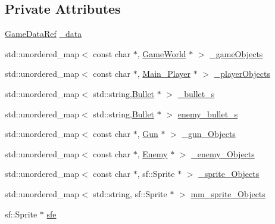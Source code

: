 \subsection*{Private Attributes}
\begin{DoxyCompactItemize}
\item 
\hyperlink{namespaceSekander_a1d69b002ba2d23020901c28f0def5e16}{Game\+Data\+Ref} \hyperlink{classSekander_1_1LoadingGameObjects_aca591b6946d7a71698a91bf97de00f4b}{\+\_\+data}
\item 
std\+::unordered\+\_\+map$<$ const char $\ast$, \hyperlink{classSekander_1_1GameWorld}{Game\+World} $\ast$ $>$ \hyperlink{classSekander_1_1LoadingGameObjects_a7308de0739e761a8b95d300096ee56e1}{\+\_\+game\+Objects}
\item 
std\+::unordered\+\_\+map$<$ const char $\ast$, \hyperlink{classSekander_1_1Main__Player}{Main\+\_\+\+Player} $\ast$ $>$ \hyperlink{classSekander_1_1LoadingGameObjects_accf2f7af898259f2108ef8acc748ac75}{\+\_\+player\+Objects}
\item 
std\+::unordered\+\_\+map$<$ std\+::string,\hyperlink{classSekander_1_1Bullet}{Bullet} $\ast$ $>$ \hyperlink{classSekander_1_1LoadingGameObjects_a6881e7f0dd40a50a243838f59e2b076d}{\+\_\+bullet\+\_\+s}
\item 
std\+::unordered\+\_\+map$<$ std\+::string,\hyperlink{classSekander_1_1Bullet}{Bullet} $\ast$ $>$ \hyperlink{classSekander_1_1LoadingGameObjects_a566b3d1ff614edae05d037a1f44da254}{enemy\+\_\+bullet\+\_\+s}
\item 
std\+::unordered\+\_\+map$<$ const char $\ast$, \hyperlink{classSekander_1_1Gun}{Gun} $\ast$ $>$ \hyperlink{classSekander_1_1LoadingGameObjects_aeedf5c8a6d95e2d67f493c6a342d1550}{\+\_\+gun\+\_\+\+Objects}
\item 
std\+::unordered\+\_\+map$<$ const char $\ast$, \hyperlink{classSekander_1_1Enemy}{Enemy} $\ast$ $>$ \hyperlink{classSekander_1_1LoadingGameObjects_a806a9fe60a9609ccf5b44c9177636074}{\+\_\+enemy\+\_\+\+Objects}
\item 
std\+::unordered\+\_\+map$<$ const char $\ast$, sf\+::\+Sprite $\ast$ $>$ \hyperlink{classSekander_1_1LoadingGameObjects_a27952bf7b7b386de19cad86546823db1}{\+\_\+sprite\+\_\+\+Objects}
\item 
std\+::unordered\+\_\+map$<$ std\+::string, sf\+::\+Sprite $\ast$ $>$ \hyperlink{classSekander_1_1LoadingGameObjects_ae76b503bf88d7696f1a55c38a20f6d01}{mm\+\_\+sprite\+\_\+\+Objects}
\item 
sf\+::\+Sprite $\ast$ \hyperlink{classSekander_1_1LoadingGameObjects_a0c211dbd79d70d20408c7c8eccf9d013}{sfe}

\end{DoxyCompactItemize}
